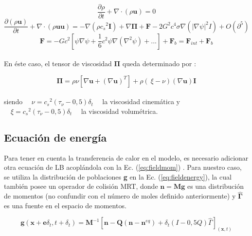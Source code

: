 \begin{equation}
	\frac{\partial \rho }{\partial t}  + \nabla \cdot \left( \rho \mathbf{u} \right) = 0
\end{equation}
\begin{equation}
	\frac{\partial \left( \rho \mathbf{u}\right)}{\partial t} + \nabla \cdot \left( \rho \mathbf{u} \mathbf{u}\right) = - \nabla \left( \rho {c_{s}}^{2} \mathbf{I} \right) + \nabla \mathbf{\Pi} + \mathbf{F} - 2 G^{2} c^{4} \sigma \nabla \left( {|\nabla \psi	|}^{2} I	\right) + O (\partial^{5})
\end{equation}
\begin{equation}
\mathbf{F} = - G c^{2} \left[	\psi \nabla \psi + \frac{1}{6} c^{2} \psi \nabla \left( \nabla^{2} \psi\right) + ...\right] + \mathbf{F}_{b} = \mathbf{F}_{int} + \mathbf{F}_{b}
\end{equation}
\\
En éste caso, el tensor de viscosidad $\mathbf{\Pi}$ queda determinado por :

\begin{equation}
	\mathbf{\Pi} = \rho \nu \left[	\nabla \mathbf{u} + {\left(\nabla \mathbf{u}\right)}^{T}\right] + \rho \left(\ \xi - \nu \right) \left( \nabla \mathbf{u}\right) \mathbf{I}
\end{equation}
\\
siendo $\quad\nu = {c_{s}}^{2} (\tau_{\nu}- 0,5) \delta_{t}\quad$ la viscosidad cinemática y $\quad\xi = {c_{s}}^{2} (\tau_{\nu}- 0,5) \delta_{t}\quad$ la viscosidad volumétrica.



\subsection{Ecuación de energía}

Para tener en cuenta la transferencia de calor en el modelo, es necesario adicionar otra ecuación de LB acoplándola con la Ec. (\ref{eq:fieldmom}) \cite{li2013lattice}. Para nuestro caso, se utiliza la distribución de poblaciones \textbf{g} en la Ec. (\ref{eq:fieldenergy}), la cual también posee un operador de colisión MRT, donde $\mathbf{n} = \mathbf{M} \mathbf{g}$ es una distribución de momentos (no confundir con el número de moles definido anteriormente) y $\mathbf{\hat{\Gamma}}$ es una fuente en el espacio de momentos.


\begin{equation}
    \mathbf{g}(\mathbf{x} + \mathbf{e} \delta_{t} ,t + \delta_{t}) = \mathbf{M}^{-1} \left[ \mathbf{n} - \mathbf{Q}(\mathbf{n} - \mathbf{n}^{eq}) + \delta_{t} \left( I - 0,5 Q \right) \hat{\Gamma}  \right]_{(\mathbf{x},t)}
    \label{eq:fieldenergy}
\end{equation}

